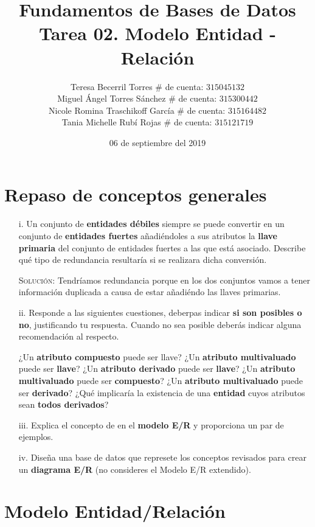 \documentclass[letterpaper,11pt]{article}
\title{Fundamentos de Bases de Datos \\
       Tarea 02. Modelo Entidad - Relación}
\author{Teresa Becerril Torres
        $\#$ de cuenta: $315045132$ \\
        Miguel Ángel Torres Sánchez
        $\#$ de cuenta: $315300442$ \\
        Nicole Romina Traschikoff García
        $\#$ de cuenta: $315164482$ \\
        Tania Michelle Rubí Rojas
        $\#$ de cuenta: $315121719$}
\date{06 de septiembre del 2019}
\begin{document}
\maketitle

\section{Repaso de conceptos generales}
\begin{itemize}
    \item[i.] Un conjunto de \textbf{entidades débiles} siempre se puede 
    convertir en un conjunto de \textbf{entidades fuertes} añadiéndoles a sus 
    atributos la \textbf{llave primaria} del conjunto de entidades fuertes a 
    las que está asociado. Describe qué tipo de redundancia resultaría si se 
    realizara dicha conversión.

    \textsc{Solución:} Tendríamos redundancia porque en los dos conjuntos vamos 
    a tener información duplicada a causa de estar añadiéndo las llaves 
    primarias.

    \item[ii.] Responde a las siguientes cuestiones, deberpas indicar 
    \textbf{si son posibles o no}, justificando tu respuesta. Cuando no sea 
    posible deberás indicar alguna recomendación al respecto.

    ¿Un \textbf{atributo compuesto} puede ser llave? ¿Un \textbf{atributo
    multivaluado} puede ser \textbf{llave}? ¿Un \textbf{atributo derivado}
    puede ser \textbf{llave}? ¿Un \textbf{atributo multivaluado} puede ser 
    \textbf{compuesto}? ¿Un \textbf{atributo multivaluado} puede ser 
    \textbf{derivado}? ¿Qué implicaría la existencia de una \textbf{entidad}
    cuyos atributos sean \textbf{todos derivados}?  
    
    \item[iii.] Explica el concepto de  en el 
    \textbf{modelo E/R} y proporciona un par de ejemplos.

    \item[iv.] Diseña una base de datos que represete los conceptos revisados 
    para crear un \textbf{diagrama E/R} (no consideres el Modelo E/R extendido).

\end{itemize}

\section{Modelo Entidad/Relación}
\end{document}
